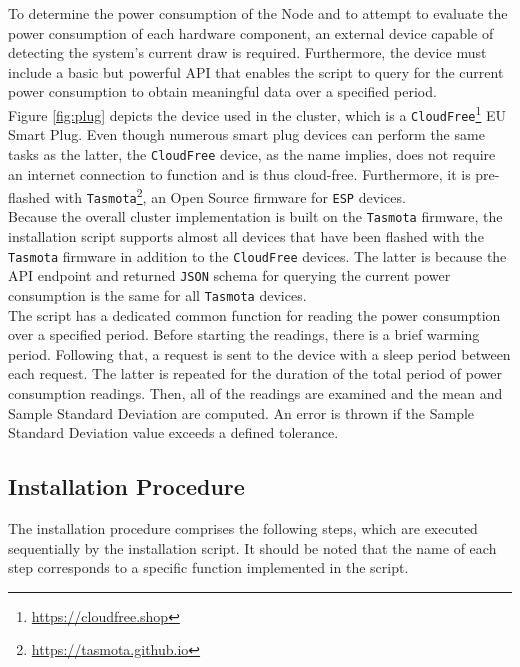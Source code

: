 To determine the power consumption of the Node and to attempt to evaluate the power
consumption of each hardware component, an external device capable of detecting
the system's current draw is required. Furthermore, the device must include a
basic but powerful API that enables the script to query for the current power
consumption to obtain meaningful data over a specified period. \\ %
Figure \ref{fig:plug} depicts the device used in the cluster, which is a \texttt{CloudFree}\footnote{\url{https://cloudfree.shop}}
EU Smart Plug. Even though numerous smart plug devices can perform the same tasks
as the latter, the \texttt{CloudFree} device, as the name implies, does not require
an internet connection to function and is thus cloud-free. Furthermore, it is pre-flashed
with \texttt{Tasmota}\footnote{\url{https://tasmota.github.io}}, an Open Source firmware
for \texttt{ESP} devices. \\ %
Because the overall cluster implementation is built on the \texttt{Tasmota} firmware,
the installation script supports almost all devices that have been flashed with
the \texttt{Tasmota} firmware in addition to the \texttt{CloudFree} devices. The
latter is because the API endpoint and returned \texttt{JSON} schema for
querying the current power consumption is the same for all \texttt{Tasmota} devices.
\\ %
The script has a dedicated common function for reading the power consumption over
a specified period. Before starting the readings, there is a brief warming period.
Following that, a request is sent to the device with a sleep period between each
request. The latter is repeated for the duration of the total period of power
consumption readings. Then, all of the readings are examined and the mean and
Sample Standard Deviation are computed. An error is thrown if the Sample Standard
Deviation value exceeds a defined tolerance.

\subsection{Installation Procedure}
\label{subsec:implementation_installer_installation_procedure}

The installation procedure comprises the following steps, which are executed sequentially
by the installation script. It should be noted that the name of each step
corresponds to a specific function implemented in the script.

